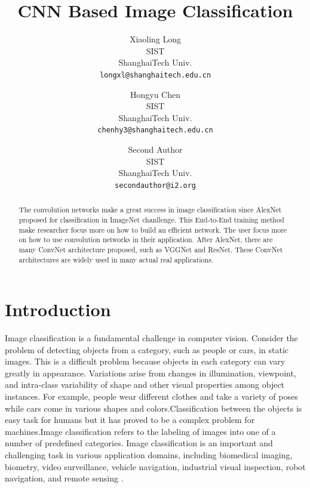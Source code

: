 \documentclass[10pt,twocolumn,letterpaper]{article}
\begin{document}
\title{	CNN Based Image Classification}

\author{Xiaoling Long\\
SIST\\
ShanghaiTech Univ.\\
{\tt\small longxl@shanghaitech.edu.cn}
\and
Hongyu Chen\\
SIST\\
ShanghaiTech Univ.\\
{\tt\small chenhy3@shanghaitech.edu.cn}
\and
Second Author\\
SIST\\
ShanghaiTech Univ.\\
{\tt\small secondauthor@i2.org}
}


\maketitle

\begin{abstract}
   The convolution networks make a great success in image classification since AlexNet proposed for classification in ImageNet chanllenge. This End-to-End training method make researcher focus more on how to build an efficient network. The user focus more on how to use convolution networks in their application. After AlexNet, there are many ConvNet architecture proposed, such as VGGNet  and ResNet. These ConvNet architectures are widely  used in many actual real applications.
\end{abstract}

\section{Introduction}
Image classification is a fundamental challenge in computer vision\cite{felzenszwalb2013visual}. Consider the problem of detecting objects from a category, such as people or cars, in static images. This is a difficult problem because objects in each category can vary greatly in appearance. Variations arise from changes in illumination, viewpoint, and intra-class variability of shape and other visual properties among object instances. For example, people wear different clothes and take a variety of poses while cars come in various shapes and colors.Classification   between   the   objects   is   easy   task   for  humans  but  it  has  proved  to  be  a  complex  problem for machines.Image classification refers to the labeling of images into one of a number of predefined categories.
Image classification is an important and challenging task in various application domains, including biomedical imaging, biometry, video surveillance, vehicle navigation, industrial visual inspection, robot navigation, and remote sensing \cite{kamavisdar2013survey}.
\end{document}
